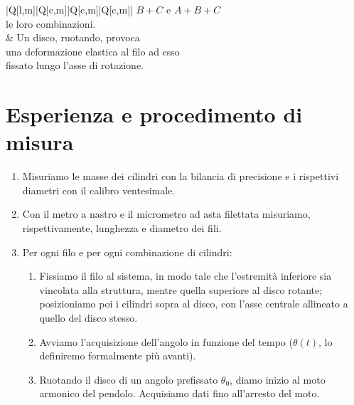 \documentclass{article}
\begin{document}
\begin{center}
\begin{tblr}{ |Q[l,m]|Q[c,m]|Q[c,m]|Q[c,m]| }
{            $B+C$ e $A+B+C$ \\
            le loro combinazioni.
            } \\
         &  {
            Un disco, ruotando, provoca \\
            una deformazione elastica al filo ad esso \\
            fissato lungo l'asse di rotazione.
        } \\
        \hline
    \end{tblr}
\end{center}

\section{Esperienza e procedimento di misura}

\begin{enumerate}
    \item
        Misuriamo le masse dei cilindri con la bilancia di precisione
        e i rispettivi diametri con il calibro ventesimale.
    \item
        Con il metro a nastro e il micrometro ad asta filettata misuriamo,
        rispettivamente, lunghezza e diametro dei fili.
    \item
        Per ogni filo e per ogni combinazione di cilindri:
    \begin{enumerate}
        \item
            Fissiamo il filo al sistema, in modo tale che l'estremità
            inferiore sia vincolata alla struttura, mentre quella superiore
            al disco rotante; posizioniamo poi
            i cilindri sopra al disco, con l'asse centrale allineato
            a quello del disco stesso.
        \item
            Avviamo l'acquisizione dell'angolo in funzione del tempo
            ($\theta(t)$, lo definiremo formalmente più avanti).
        \item
            Ruotando il disco di un angolo prefissato $\theta_0$,
            diamo inizio al moto armonico del pendolo.
            Acquisiamo dati fino all'arresto del moto.
    \end{enumerate}
\end{enumerate}
\end{document}
